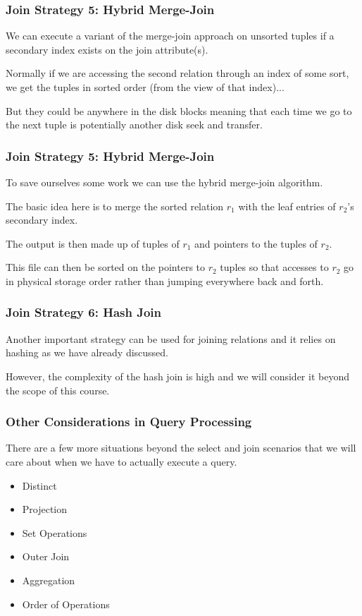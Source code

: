 \begin{frame}
\frametitle{Join Strategy 5: Hybrid Merge-Join}

We can execute a variant of the merge-join approach on unsorted tuples if a secondary index exists on the join attribute(s). 

Normally if we are accessing the second relation through an index of some sort, we get the tuples in sorted order (from the view of that index)...

But they could be anywhere in the disk blocks meaning that each time we go to the next tuple is potentially another disk seek and transfer.

\end{frame}

\begin{frame}
\frametitle{Join Strategy 5: Hybrid Merge-Join}

To save ourselves some work we can use the hybrid merge-join algorithm.

The basic idea here is to merge the sorted relation $r_{1}$ with the leaf entries of $r_{2}$'s secondary index. 

The output is then made up of tuples of $r_{1}$ and pointers to the tuples of $r_{2}$. 

This file can then be sorted on the pointers to $r_{2}$ tuples so that accesses to $r_{2}$ go in physical storage order rather than jumping everywhere back and forth.

\end{frame}


\begin{frame}
\frametitle{Join Strategy 6: Hash Join}

Another important strategy can be used for joining relations and it relies on hashing as we have already discussed. 

However, the complexity of the hash join is high and we will consider it beyond the scope of this course.

\end{frame}


\begin{frame}
\frametitle{Other Considerations in Query Processing}

There are a few more situations beyond the select and join scenarios that we will care about when we have to actually execute a query.

\begin{itemize}
	\item Distinct
	\item Projection
	\item Set Operations
	\item Outer Join
	\item Aggregation
	\item Order of Operations
\end{itemize}


\end{frame}

